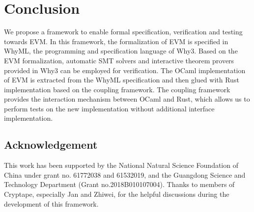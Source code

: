 \documentclass[runningheads]{llncs}
\begin{document}

\section{Conclusion}\label{Sec: Conclusion}
We propose a framework to enable formal specification, verification and testing towards EVM. In this framework, the formalization of EVM is specified in WhyML, the programming and specification language of Why3. Based on the EVM formalization, automatic SMT solvers and interactive theorem provers provided in Why3 can be employed for verification. The OCaml implementation of EVM is extracted from the WhyML specification and then glued with Rust implementation based on the coupling framework. The coupling framework provides the interaction mechanism between OCaml and Rust, which allows us to perform tests on the new implementation without additional interface implementation.

\subsection*{Acknowledgement}
\noindent This work has been supported by the National Natural Science Foundation of China under grant no. 61772038 and 61532019, and the Guangdong Science and Technology Department (Grant no.2018B010107004). Thanks to members of Cryptape, especially Jan and Zhiwei, for the helpful discussions during the development of this framework.




\end{document}
